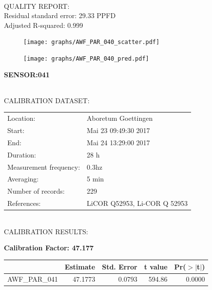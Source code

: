 \documentclass[oneside]{report}
\begin{document}
\hrulefill\\
QUALITY REPORT:\\
Residual standard error: 29.33 PPFD\\
Adjusted R-squared: 0.999



\begin{figure}[H]
  \centering
  \texttt{[image: graphs/AWF\_PAR\_040\_scatter.pdf]}
\end{figure}




\begin{figure}[H]
  \centering
  \texttt{[image: graphs/AWF\_PAR\_040\_pred.pdf]}
\end{figure}

\pagebreak


\begin{center}
\large{\textbf{SENSOR:041}}\\
\end{center}

\hrulefill\\
CALIBRATION DATASET:\\
\begin{table}[h!]
  \centering
  \label{tab:table1}
  \begin{tabular}{ll}
    Location: & Aboretum Goettingen\\ 
    
    
    Start:  & Mai 23 09:49:30 2017 \\
    End:   & Mai 24 13:29:00 2017\\ 
    Duration: & 28 h\\
    Measurement frequency: & 0.3hz\\
    Averaging:  &5 min\\
    Number of records: & 229 \\
    References: & LiCOR Q52953, Li-COR Q 52953 \\
  \end{tabular}
\end{table}

\hrulefill\\
CALIBRATION RESULTS:\\


\begin{center}
\textbf{\large{Calibration Factor: 47.177}}\\
\end{center}
\begin{table}[ht]
\centering
\begin{tabular}{rrrrr}
  \hline
 & Estimate & Std. Error & t value & Pr($>$$|$t$|$) \\ 
  \hline
AWF\_PAR\_041 & 47.1773 & 0.0793 & 594.86 & 0.0000 \\ 
   \hline
\end{tabular}
\end{table}
\end{document}
